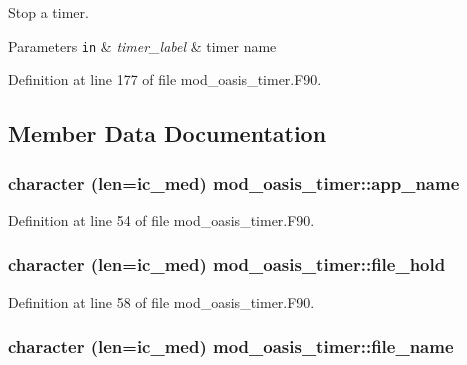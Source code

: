 Stop a timer. 


\begin{DoxyParams}[1]{Parameters}
\mbox{\tt in}  & {\em timer\+\_\+label} & timer name \\
\hline
\end{DoxyParams}


Definition at line 177 of file mod\+\_\+oasis\+\_\+timer.\+F90.



\subsection{Member Data Documentation}
\hypertarget{classmod__oasis__timer_ad73dfe7213bbfab6212b9617000f4ce3}{
\subsubsection[{app\+\_\+name}]{\setlength{\rightskip}{0pt plus 5cm}character (len=ic\+\_\+med) mod\+\_\+oasis\+\_\+timer\+::app\+\_\+name\hspace{0.3cm}{\ttfamily [private]}}}\label{classmod__oasis__timer_ad73dfe7213bbfab6212b9617000f4ce3}


Definition at line 54 of file mod\+\_\+oasis\+\_\+timer.\+F90.

\hypertarget{classmod__oasis__timer_a25a9f5f978c475475b48d782c4ad279c}{
\subsubsection[{file\+\_\+hold}]{\setlength{\rightskip}{0pt plus 5cm}character (len=ic\+\_\+med) mod\+\_\+oasis\+\_\+timer\+::file\+\_\+hold\hspace{0.3cm}{\ttfamily [private]}}}\label{classmod__oasis__timer_a25a9f5f978c475475b48d782c4ad279c}


Definition at line 58 of file mod\+\_\+oasis\+\_\+timer.\+F90.

\hypertarget{classmod__oasis__timer_a12dc3f95f8178d2ea46037a33da0e823}{
\subsubsection[{file\+\_\+name}]{\setlength{\rightskip}{0pt plus 5cm}character (len=ic\+\_\+med) mod\+\_\+oasis\+\_\+timer\+::file\+\_\+name\hspace{0.3cm}{\ttfamily [private]}}}\label{classmod__oasis__timer_a12dc3f95f8178d2ea46037a33da0e823}


